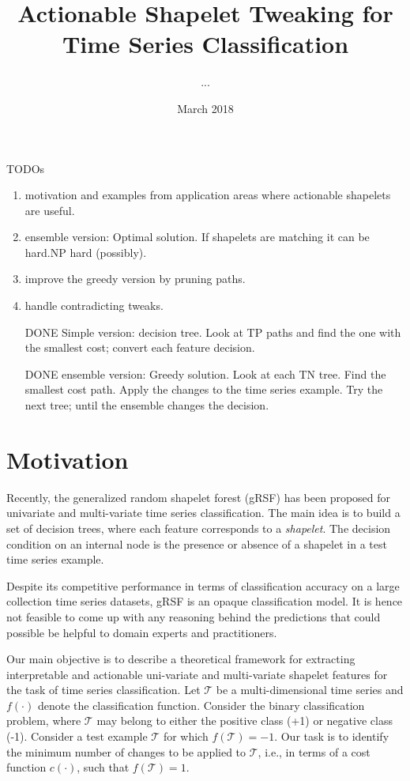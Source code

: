 \documentclass[smallextended,natbib]{svjour3}
\title{Actionable Shapelet Tweaking for Time Series Classification}
\author{...}
\date{March 2018}
\begin{document}
\maketitle

TODOs
\begin{enumerate}
\item  motivation and examples from application areas where actionable shapelets are useful.

\item  ensemble version: Optimal solution. If shapelets are matching it can be hard.NP hard (possibly). 

\item improve the greedy version by pruning paths.

\item handle contradicting tweaks.

\item [DONE] Simple version: decision tree. Look at TP paths and find the one with the smallest cost; convert each feature decision.

\item [DONE] ensemble version: Greedy solution. Look at each TN tree. Find the smallest cost path. Apply the changes to the time series example. Try the next tree; until the ensemble changes the decision. 

\end{enumerate}

\section{Motivation}
Recently, the generalized random shapelet forest (gRSF) \citep{KarlssonPB16} has been proposed for univariate and multi-variate time series classification. The main idea is to build a set of decision trees, where each feature corresponds to a \emph{shapelet}. The decision condition on an internal node is the presence or absence of a shapelet in a test time series example.

Despite its competitive performance in terms of classification accuracy on a large collection time series datasets, gRSF is an opaque classification model. It is hence not feasible to come up with any reasoning behind the predictions that could possible be helpful to domain experts and practitioners.

Our main objective is to describe a theoretical framework for extracting interpretable and actionable uni-variate and multi-variate shapelet features for the task of time series classification. Let $\mathcal{T}$ be a multi-dimensional time series and $f(\cdot)$ denote the classification function. Consider the binary classification problem, where $\mathcal{T}$ may belong to either the positive class (+1) or negative class (-1). Consider a test example $\mathcal{T}$ for which $f(\mathcal{T}) = -1$. Our task is to identify the minimum number of changes to be applied to $\mathcal{T}$, i.e., in terms of a cost function $c(\cdot)$, such that $f(\mathcal{T}) = 1$.
\end{document}
